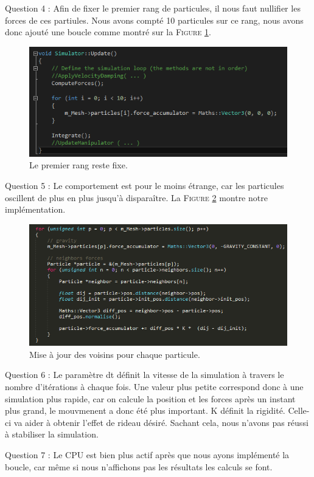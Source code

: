 \documentclass[a4paper,12pt]{article}
\begin{document}
Question 4 : Afin de fixer le premier rang de particules, il nous faut nullifier les forces de ces partiules. Nous avons compté 10 particules sur ce rang, nous avons donc ajouté une boucle comme montré sur la \textsc{Figure} \ref{fig:q4}.
\begin{figure}
  \centering
  \includegraphics{q4.png}
  \caption{Le premier rang reste fixe.}
  \label{fig:q4}
\end{figure}

Question 5 : Le comportement est pour le moins étrange, car les particules oscillent de plus en plus jusqu'à disparaître.
La \textsc{Figure} \ref{fig:q5} montre notre implémentation.
\begin{figure}
  \centering
  \includegraphics{q5.png}
  \caption{Mise à jour des voisins pour chaque particule.}
  \label{fig:q5}
\end{figure}

Question 6 : Le paramètre dt définit la vitesse de la simulation à travers le nombre d'itérations à  chaque fois. Une valeur plus petite correspond donc à une simulation plus rapide, car on calcule la position et les forces après un instant plus grand, le mouvmenent a donc été plus important.
K définit la rigidité. Celle-ci va aider à obtenir l'effet de rideau désiré. Sachant cela, nous n'avons pas réussi à stabiliser la simulation.

Question 7 : Le CPU est bien plus actif après que nous ayons implémenté la boucle, car même si nous n'affichons pas les résultats les calculs se font.
\end{document}
